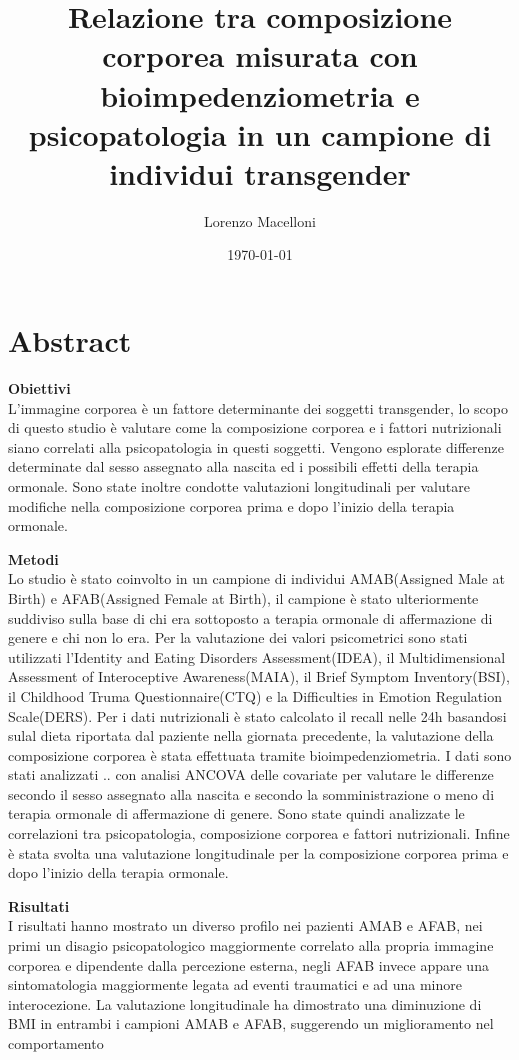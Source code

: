 \documentclass[12pt]{article}
\author{Lorenzo Macelloni}
\date{\today}
\title{Relazione tra composizione corporea misurata con bioimpedenziometria e psicopatologia in un campione di individui transgender}
\begin{document}
\maketitle
\tableofcontents

\section{Abstract}
\label{sec:org9efe01f}
\textbf{Obiettivi} \\
L'immagine corporea è un fattore determinante dei soggetti transgender, lo scopo di questo studio è valutare come la composizione corporea e i fattori nutrizionali siano correlati alla psicopatologia in questi soggetti.
Vengono esplorate differenze determinate dal sesso assegnato alla nascita ed i possibili effetti della terapia ormonale.
Sono state inoltre condotte valutazioni longitudinali per valutare modifiche nella composizione corporea prima e dopo l'inizio della terapia ormonale.

\textbf{Metodi} \\
Lo studio è stato coinvolto in un campione di individui AMAB(Assigned Male at Birth) e AFAB(Assigned Female at Birth), il campione è stato ulteriormente suddiviso sulla base di chi era sottoposto a terapia ormonale di affermazione di genere e chi non lo era.
Per la valutazione dei valori psicometrici sono stati utilizzati l'Identity and Eating Disorders Assessment(IDEA), il Multidimensional Assessment of Interoceptive Awareness(MAIA), il Brief Symptom Inventory(BSI), il Childhood Truma Questionnaire(CTQ) e la Difficulties in Emotion Regulation Scale(DERS).
Per i dati nutrizionali è stato calcolato il recall nelle 24h basandosi sulal dieta riportata dal paziente nella giornata precedente, la valutazione della composizione corporea è stata effettuata tramite bioimpedenziometria.
I dati sono stati analizzati .. con analisi ANCOVA delle covariate per valutare le differenze secondo il sesso assegnato alla nascita e secondo la somministrazione o meno di terapia ormonale di affermazione di genere. Sono state quindi analizzate le correlazioni tra psicopatologia, composizione corporea e fattori nutrizionali. Infine è stata svolta una valutazione longitudinale per la composizione corporea prima e dopo l'inizio della terapia ormonale.

\textbf{Risultati} \\
I risultati hanno mostrato un diverso profilo nei pazienti AMAB e AFAB, nei primi un disagio psicopatologico maggiormente correlato alla propria immagine corporea e dipendente dalla percezione esterna, negli AFAB invece appare una sintomatologia maggiormente legata ad eventi traumatici e ad una minore interocezione.
La valutazione longitudinale ha dimostrato una diminuzione di BMI in entrambi i campioni AMAB e AFAB, suggerendo un miglioramento nel comportamento
\end{document}
